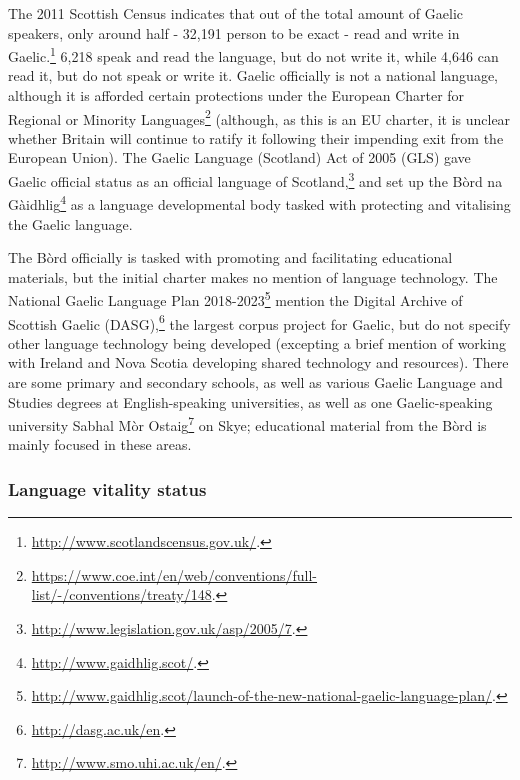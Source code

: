 The 2011 Scottish Census indicates that out of the total amount of Gaelic speakers, only around half - 32,191 person to be exact - read and write in Gaelic.\footnote{\href{http://www.scotlandscensus.gov.uk/}{http://www.scotlandscensus.gov.uk/}. } 6,218 speak and read the language, but do not write it, while 4,646 can read it, but do not speak or write it. Gaelic officially is not a national language, although it is afforded certain protections under the European Charter for Regional or Minority Languages\footnote{\href{https://www.coe.int/en/web/conventions/full-list/-/conventions/treaty/148}{https://www.coe.int/en/web/conventions/full-list/-/conventions/treaty/148}. } (although, as this is an EU charter, it is unclear whether Britain will continue to ratify it following their impending exit from the European Union). The Gaelic Language (Scotland) Act of 2005 (GLS) gave Gaelic official status as an official language of Scotland,\footnote{\href{http://www.legislation.gov.uk/asp/2005/7}{http://www.legislation.gov.uk/asp/2005/7}. } and set up the B\`ord na G\`aidhlig\footnote{\href{http://www.gaidhlig.scot/}{http://www.gaidhlig.scot/}. } as a language developmental body tasked with protecting and vitalising the Gaelic language.

The B\`ord officially is tasked with promoting and facilitating educational materials, but the initial charter makes no mention of language technology. The National Gaelic Language Plan 2018-2023\footnote{\href{http://www.gaidhlig.scot/launch-of-the-new-national-gaelic-language-plan/}{http://www.gaidhlig.scot/launch-of-the-new-national-gaelic-language-plan/}. } \citep{bord2018national} mention the Digital Archive of Scottish Gaelic (DASG),\footnote{\href{http://dasg.ac.uk/en}{http://dasg.ac.uk/en}. } the largest corpus project for Gaelic, but do not specify other language technology being developed (excepting a brief mention of working with Ireland and Nova Scotia developing shared technology and resources). There are some primary and secondary schools, as well as various Gaelic Language and Studies degrees at English-speaking universities, as well as one Gaelic-speaking university Sabhal M\`or Ostaig\footnote{\href{http://www.smo.uhi.ac.uk/en/}{http://www.smo.uhi.ac.uk/en/}. } on Skye; educational material from the B\`ord is mainly focused in these areas.

\subsubsection{Language vitality status}
\label{sec:gaelic-vitality-status}


